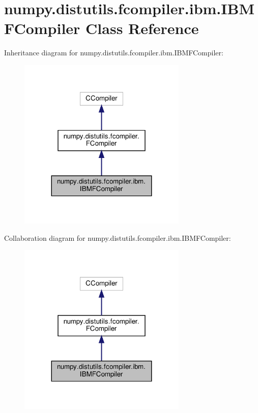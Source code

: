 \hypertarget{classnumpy_1_1distutils_1_1fcompiler_1_1ibm_1_1IBMFCompiler}{}\section{numpy.\+distutils.\+fcompiler.\+ibm.\+I\+B\+M\+F\+Compiler Class Reference}
\label{classnumpy_1_1distutils_1_1fcompiler_1_1ibm_1_1IBMFCompiler}


Inheritance diagram for numpy.\+distutils.\+fcompiler.\+ibm.\+I\+B\+M\+F\+Compiler\+:
\nopagebreak
\begin{figure}[H]
\begin{center}
\leavevmode
\includegraphics[width=227pt]{classnumpy_1_1distutils_1_1fcompiler_1_1ibm_1_1IBMFCompiler__inherit__graph}
\end{center}
\end{figure}


Collaboration diagram for numpy.\+distutils.\+fcompiler.\+ibm.\+I\+B\+M\+F\+Compiler\+:
\nopagebreak
\begin{figure}[H]
\begin{center}
\leavevmode
\includegraphics[width=227pt]{classnumpy_1_1distutils_1_1fcompiler_1_1ibm_1_1IBMFCompiler__coll__graph}
\end{center}
\end{figure}
